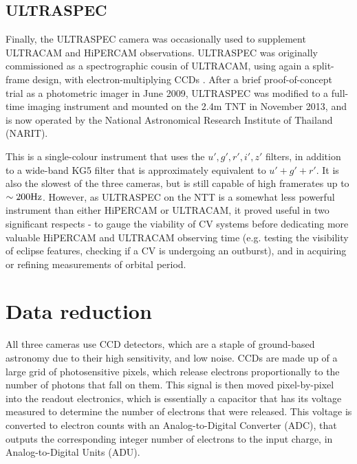 \subsection{ULTRASPEC}
\label{sect:observations:ultraspec}

Finally, the ULTRASPEC camera was occasionally used to supplement ULTRACAM and HiPERCAM observations. ULTRASPEC was originally commissioned as a spectrographic cousin of ULTRACAM, using again a split-frame design, with electron-multiplying CCDs \citep{dhillon2014}. 
After a brief proof-of-concept trial as a photometric imager in June 2009, ULTRASPEC was modified to a full-time imaging instrument and mounted on the 2.4m TNT in November 2013, and is now operated by the National Astronomical Research Institute of Thailand (NARIT).

This is a single-colour instrument that uses the $u',g',r',i',z'$ filters, in addition to a wide-band KG5 filter that is approximately equivalent to $u' + g' + r'$. It is also the slowest of the three cameras, but is still capable of high framerates up to $\sim 200 \rm Hz$. However, as ULTRASPEC on the NTT is a somewhat less powerful instrument than either HiPERCAM or ULTRACAM, it proved useful in two significant respects - to gauge the viability of CV systems before dedicating more valuable HiPERCAM and ULTRACAM observing time (e.g. testing the visibility of eclipse features, checking if a CV is undergoing an outburst), and in acquiring or refining measurements of orbital period.


\section{Data reduction}
\label{sect:observations:data reduction}

All three cameras use CCD detectors, which are a staple of ground-based astronomy due to their high sensitivity, and low noise.
CCDs are made up of a large grid of photosensitive pixels, which release electrons proportionally to the number of photons that fall on them. This signal is then moved pixel-by-pixel into the readout electronics, which is essentially a capacitor that has its voltage measured to determine the number of electrons that were released. This voltage is converted to electron counts with an Analog-to-Digital Converter (ADC), that outputs the corresponding integer number of electrons to the input charge, in Analog-to-Digital Units (ADU).

